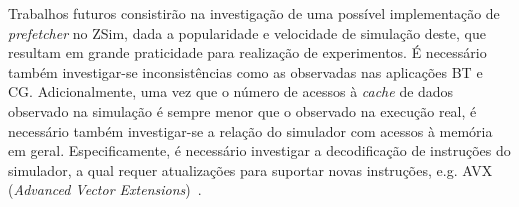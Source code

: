 \documentclass[12pt]{article}
\begin{document}
\vspace{-2mm}
Trabalhos futuros consistirão na investigação de uma possível implementação de \textit{prefetcher} no ZSim, dada a popularidade e velocidade de simulação deste, que resultam em grande praticidade para realização de experimentos.
É necessário também investigar-se inconsistências como as observadas nas aplicações BT e CG.
Adicionalmente, uma vez que o número de acessos à \textit{cache} de dados observado na simulação é sempre menor que o observado na execução real, é necessário também investigar-se a relação do simulador com acessos à memória em geral.
Especificamente, é necessário investigar a decodificação de instruções do simulador, a qual requer atualizações para suportar novas instruções, e.g. AVX (\emph{Advanced Vector Extensions})~\mbox{\cite{lomont2011introduction}}.

 




\end{document}
